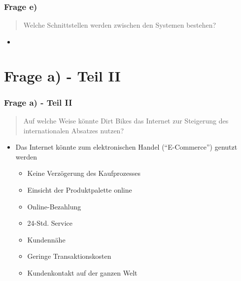 \documentclass{beamer}
\begin{document}
\begin{frame}
\frametitle{Frage e)}

\begin{quote}
Welche Schnittstellen werden zwischen den Systemen bestehen?
\end{quote}

\begin{itemize}
\setlength{\itemsep}{14pt}
\item 
\end{itemize}

\end{frame}

\section{Frage a) - Teil II}
\begin{frame}
\frametitle{Frage a) - Teil II}

\begin{quote}
Auf welche Weise k\"onnte Dirt Bikes das Internet zur Steigerung des internationalen Absatzes nutzen?
\end{quote}

\begin{itemize}
\item Das Internet k\"onnte zum elektronischen Handel (``E-Commerce'') genutzt werden
\begin{itemize}
\setlength{\itemsep}{8pt}
\item Keine Verz\"ogerung des Kaufprozesses
\item Einsicht der Produktpalette online
\item Online-Bezahlung
\item 24-Std. Service
\item Kundenn\"ahe
\item Geringe Transaktionskosten
\item Kundenkontakt auf der ganzen Welt
\end{itemize}
\end{itemize}

\end{frame}
\end{document}
